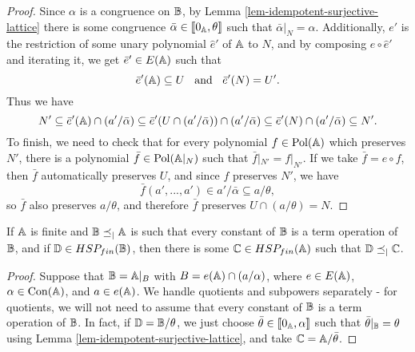 \begin{appendices}
\begin{proof}
Since $\alpha$ is a congruence on $\mathbb{B}$, by Lemma \ref{lem-idempotent-surjective-lattice} there is some congruence $\bar{\alpha} \in \llbracket 0_{\mathbb{A}}, \theta \rrbracket$ such that $\bar{\alpha}|_N = \alpha$. Additionally, $e'$ is the restriction of some unary polynomial $\hat{e}'$ of $\mathbb{A}$ to $N$, and by composing $e \circ \hat{e}'$ and iterating it, we get $\bar{e}' \in E(\mathbb{A})$ such that
\[
\bar{e}'(\mathbb{A}) \subseteq U \;\; \text{ and } \;\; \bar{e}'(N) = U'.
\]
Thus we have
\[
N' \subseteq \bar{e}'(\mathbb{A}) \cap (a'/\bar{\alpha}) \subseteq \bar{e}'(U \cap (a'/\bar{\alpha})) \cap (a'/\bar{\alpha}) \subseteq \bar{e}'(N) \cap (a'/\bar{\alpha}) \subseteq N'.
\]
To finish, we need to check that for every polynomial $f \in \operatorname{Pol}(\mathbb{A})$ which preserves $N'$, there is a polynomial $\bar{f} \in \operatorname{Pol}(\mathbb{A}|_N)$ such that $\bar{f}|_{N'} = f|_{N'}$. If we take $\bar{f} = e \circ f$, then $\bar{f}$ automatically preserves $U$, and since $f$ preserves $N'$, we have
\[
\bar{f}(a', ..., a') \in a'/\bar{\alpha} \subseteq a/\theta,
\]
so $\bar{f}$ also preserves $a/\theta$, and therefore $\bar{f}$ preserves $U \cap (a/\theta) = N$.
\end{proof}


\begin{prop}\label{prop-restrict-variety} If $\mathbb{A}$ is finite and $\mathbb{B} \preceq_| \mathbb{A}$ is such that every constant of $\mathbb{B}$ is a term operation of $\mathbb{B}$, and if $\mathbb{D} \in HSP_{fin}(\mathbb{B})$, then there is some $\mathbb{C} \in HSP_{fin}(\mathbb{A})$ such that $\mathbb{D} \preceq_| \mathbb{C}$.
\end{prop}
\begin{proof} Suppose that $\mathbb{B} = \mathbb{A}|_B$ with $B = e(\mathbb{A}) \cap (a/\alpha)$, where $e \in E(\mathbb{A})$, $\alpha \in \operatorname{Con}(\mathbb{A})$, and $a \in e(\mathbb{A})$. We handle quotients and subpowers separately - for quotients, we will not need to assume that every constant of $\mathbb{B}$ is a term operation of $\mathbb{B}$. In fact, if $\mathbb{D} = \mathbb{B}/\theta$, we just choose $\bar{\theta} \in \llbracket 0_{\mathbb{A}}, \alpha \rrbracket$ such that $\bar{\theta}|_{\mathbb{B}} = \theta$ using Lemma \ref{lem-idempotent-surjective-lattice}, and take $\mathbb{C} = \mathbb{A}/\bar{\theta}$.


\end{proof}
\end{appendices}
